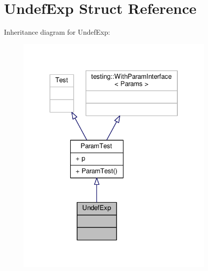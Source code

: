 \hypertarget{struct_undef_exp}{}\section{Undef\+Exp Struct Reference}
\label{struct_undef_exp}


Inheritance diagram for Undef\+Exp\+:
\nopagebreak
\begin{figure}[H]
\begin{center}
\leavevmode
\includegraphics[width=274pt]{struct_undef_exp__inherit__graph}
\end{center}
\end{figure}


